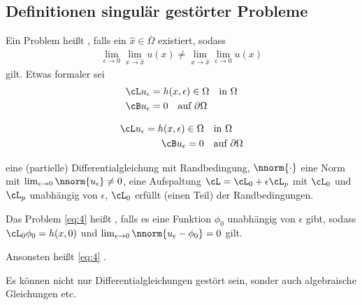 \subsection{Definitionen singulär gestörter Probleme}
\begin{definition}
  Ein Problem heißt , falls ein $\hat x \in \bar \Omega$ existiert, sodass
  \begin{align*}
    \lim_{\epsilon \to 0} \lim_{x \to \hat x} u(x) \neq \lim_{x \to \hat x} \lim_{\epsilon \to 0}  u(x) 
  \end{align*}
gilt. Etwas formaler sei
\begin{align}\label{eq:4}
  \cL u_{\epsilon} &= h(x, \epsilon) \in \Omega \quad \text{in } \Omega\\
  \cB u_{\epsilon} &= 0 \quad \text{auf } \partial \Omega \notag
\end{align}


\begin{align*}
  \cL u_{\epsilon} = h(x, \epsilon) \in \Omega \quad &\text{in } \Omega\\
  \cB u_{\epsilon} = 0 \quad &\text{auf } \partial \Omega 
\end{align*}


eine (partielle) Differentialgleichung mit Randbedingung,  $\nnorm {\cdot}$ eine Norm mit $\lim_{\epsilon \to 0} \nnorm{u_{\epsilon}} \neq 0$, eine Aufspaltung $\cL = \cL_{0} + \epsilon \cL_{p}$ mit $\cL_{0}$ und $\cL_{p}$ unabhängig von $\epsilon$, $\cL_{0}$ erfüllt (einen Teil) der Randbedingungen. 
\end{definition}
\begin{definition} \label{def:1-2}
  Das Problem \eqref{eq:4} heißt , falls es eine Funktion $\phi_{0}$ unabhängig von $\epsilon$ gibt, sodass $\cL_{0}\phi_{0} = h(x, 0)$ und $\lim_{\epsilon\to 0} \nnorm{u_{\epsilon} - \phi_{0}} = 0$ gilt. 

Ansonsten heißt \eqref{eq:4} . 
\end{definition}
Es können nicht nur Differentialgleichungen gestört sein, sonder auch algebraische Gleichungen etc.

